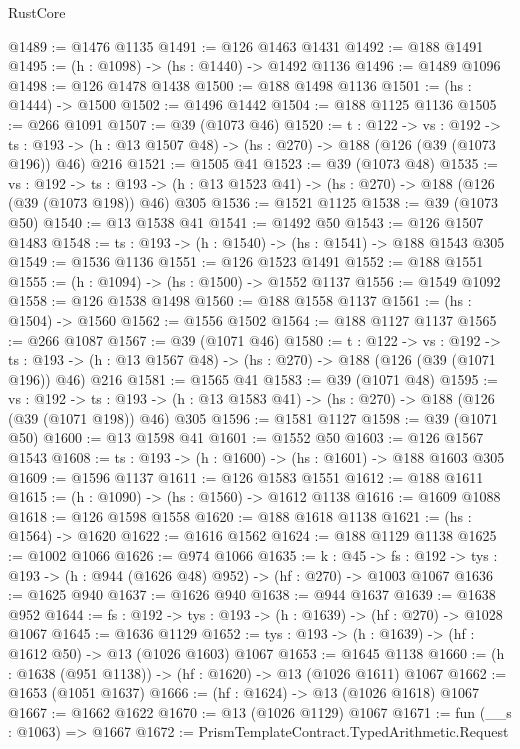 \begin{lexlean}{RustCore}
\begin{coremodule}
@1489 := @1476 @1135
@1491 := @126 @1463 @1431
@1492 := @188 @1491
@1495 := (h : @1098) -> (hs : @1440) -> @1492 @1136
@1496 := @1489 @1096
@1498 := @126 @1478 @1438
@1500 := @188 @1498 @1136
@1501 := (hs : @1444) -> @1500
@1502 := @1496 @1442
@1504 := @188 @1125 @1136
@1505 := @266 @1091
@1507 := @39 (@1073 @46)
@1520 := {t : @122} ->
  {vs : @192} ->
  {ts : @193} -> (h : @13 @1507 @48) -> (hs : @270) -> @188 (@126 (@39 (@1073 @196)) @46) @216
@1521 := @1505 @41
@1523 := @39 (@1073 @48)
@1535 := {vs : @192} ->
  {ts : @193} -> (h : @13 @1523 @41) -> (hs : @270) -> @188 (@126 (@39 (@1073 @198)) @46) @305
@1536 := @1521 @1125
@1538 := @39 (@1073 @50)
@1540 := @13 @1538 @41
@1541 := @1492 @50
@1543 := @126 @1507 @1483
@1548 := {ts : @193} -> (h : @1540) -> (hs : @1541) -> @188 @1543 @305
@1549 := @1536 @1136
@1551 := @126 @1523 @1491
@1552 := @188 @1551
@1555 := (h : @1094) -> (hs : @1500) -> @1552 @1137
@1556 := @1549 @1092
@1558 := @126 @1538 @1498
@1560 := @188 @1558 @1137
@1561 := (hs : @1504) -> @1560
@1562 := @1556 @1502
@1564 := @188 @1127 @1137
@1565 := @266 @1087
@1567 := @39 (@1071 @46)
@1580 := {t : @122} ->
  {vs : @192} ->
  {ts : @193} -> (h : @13 @1567 @48) -> (hs : @270) -> @188 (@126 (@39 (@1071 @196)) @46) @216
@1581 := @1565 @41
@1583 := @39 (@1071 @48)
@1595 := {vs : @192} ->
  {ts : @193} -> (h : @13 @1583 @41) -> (hs : @270) -> @188 (@126 (@39 (@1071 @198)) @46) @305
@1596 := @1581 @1127
@1598 := @39 (@1071 @50)
@1600 := @13 @1598 @41
@1601 := @1552 @50
@1603 := @126 @1567 @1543
@1608 := {ts : @193} -> (h : @1600) -> (hs : @1601) -> @188 @1603 @305
@1609 := @1596 @1137
@1611 := @126 @1583 @1551
@1612 := @188 @1611
@1615 := (h : @1090) -> (hs : @1560) -> @1612 @1138
@1616 := @1609 @1088
@1618 := @126 @1598 @1558
@1620 := @188 @1618 @1138
@1621 := (hs : @1564) -> @1620
@1622 := @1616 @1562
@1624 := @188 @1129 @1138
@1625 := @1002 @1066
@1626 := @974 @1066
@1635 := {k : @45} ->
  {fs : @192} -> {tys : @193} -> (h : @944 (@1626 @48) @952) -> (hf : @270) -> @1003 @1067
@1636 := @1625 @940
@1637 := @1626 @940
@1638 := @944 @1637
@1639 := @1638 @952
@1644 := {fs : @192} -> {tys : @193} -> (h : @1639) -> (hf : @270) -> @1028 @1067
@1645 := @1636 @1129
@1652 := {tys : @193} -> (h : @1639) -> (hf : @1612 @50) -> @13 (@1026 @1603) @1067
@1653 := @1645 @1138
@1660 := (h : @1638 (@951 @1138)) -> (hf : @1620) -> @13 (@1026 @1611) @1067
@1662 := @1653 (@1051 @1637)
@1666 := (hf : @1624) -> @13 (@1026 @1618) @1067
@1667 := @1662 @1622
@1670 := @13 (@1026 @1129) @1067
@1671 := fun (__s : @1063) => @1667
@1672 := PrismTemplateContract.TypedArithmetic.Request

\end{coremodule}
\end{lexlean}
